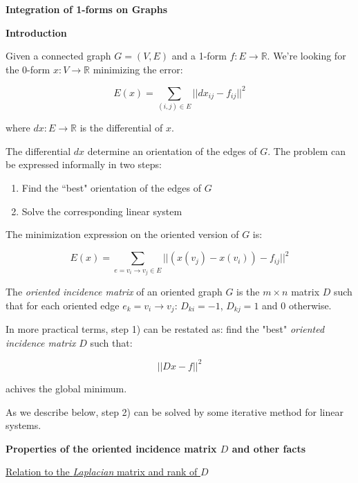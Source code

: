\documentclass[a4paper,11pt]{article}
\begin{document}
\textbf{Integration of 1-forms on Graphs}

\bigskip

\textbf{Introduction}

\bigskip

Given a connected graph $G=(V,E)$ and a 1-form $f: E \rightarrow 
\mathbb{R}$. We're looking for the 0-form $x: V \rightarrow \mathbb{R}$ 
minimizing the error:

$$E(x) = \sum_{(i,j) \in E} ||dx_{ij} - f_{ij}||^2$$

where $dx: E \rightarrow \mathbb{R}$ is the differential of $x$.

\bigskip

The differential $dx$ determine an orientation of the edges of $G$. 
The problem can be expressed informally in two steps:

\begin{enumerate}
\item Find the ``best" orientation of the edges of $G$
\item Solve the corresponding linear system
\end{enumerate}

The minimization expression on the oriented version of $G$ is: 

$$E(x) = \sum_{e=v_i \rightarrow v_j \in E} ||(x(v_j) - x(v_i)) - f_{ij}||^2$$

\bigskip

The \textit{oriented incidence matrix} of an oriented graph $G$ is the $m 
\times n$ matrix $D$ such that for each oriented edge $e_k=v_i \rightarrow 
v_j$: $D_{ki} = -1$, $D_{kj} = 1$ and $0$ otherwise.

\bigskip

In more practical terms, step 1) can be restated as: find the "best" 
\textit{oriented incidence matrix} $D$ such that: 

$$||Dx-f||^2$$

achives the global minimum.

\bigskip

As we describe below, step 2) can be solved by some iterative method for 
linear systems.

\bigskip

\textbf{Properties of the oriented incidence matrix $D$ and other facts}

\bigskip

\underline{Relation to the \textit{Laplacian} matrix and rank of $D$}

\bigskip
\end{document}
